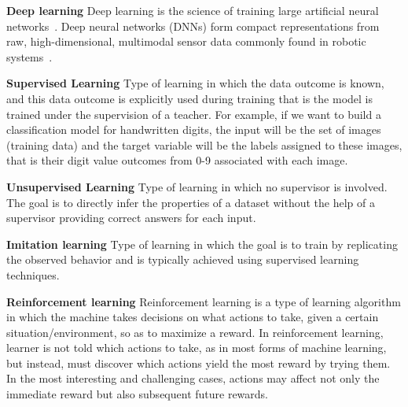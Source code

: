 \begin{description}

\item{\textbf{Deep learning}}
Deep learning is the science of training large artificial neural networks~\cite{pierson2017deep}. Deep neural networks (DNNs) form compact
representations from raw, high-dimensional, multimodal sensor data commonly
found in robotic systems~\cite{bohmer2015autonomous}.




\item{\textbf{Supervised Learning}}
Type of learning in which the data outcome is known, and this data outcome is explicitly used during training that is the model is trained under the supervision of a teacher. For example, if we want to build a classification model for handwritten digits, the input will be the set of images (training data) and the target variable will be the labels assigned to these images, that is their digit value outcomes from 0-9 associated with each image.

\item{\textbf{Unsupervised Learning}}
Type of learning in which no supervisor is involved.   The goal is to directly infer the properties of a dataset without the help of a supervisor providing correct answers for each input.

\item{\textbf{Imitation learning}}
Type of learning in which the goal is to train by replicating the observed behavior and is typically achieved using supervised learning techniques.

\item{\textbf{Reinforcement learning}}
Reinforcement learning is a type of learning algorithm in which the machine takes decisions on what actions to take, given a certain situation/environment, so as to maximize a reward. In reinforcement learning, learner is not told which actions to take, as in most forms of machine learning, but instead, must discover which actions yield the most reward by trying them. In the most interesting and challenging cases, actions may affect not only the immediate reward but also subsequent future  rewards.\\
\\

\end{description}


